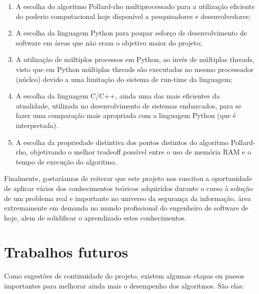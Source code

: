 \begin{enumerate}
\item A escolha do algoritmo Pollard-rho multiprocessado para a utilização eficiente do poderio computacional hoje disponível a pesquisadores e desenvolvedores;

\item A escolha da linguagem Python para poupar esforço de desenvolvimento de
software em áreas que não eram o objetivo maior do projeto;

\item A utilização de múltiplos processos em Python, ao invés de múltiplas threads, visto que em Python múltiplas threads são executadas no mesmo processador (núcleo) devido a uma limitação do sistema de run-time da linguagem;

\item A escolha da linguagem C/C++, ainda uma das mais eficientes da atualidade, utilizada no desenvolvimento de sistemas embarcados, para se fazer uma comparação mais apropriada com a linguagem Python (que é interpretada).

\item A escolha da propriedade distintiva dos pontos distintos do algoritmo Pollard-rho, objetivando o melhor tradeoff possível entre o uso de memória RAM e o tempo de execução do algoritmo.
\end{enumerate}

Finalmente, gostaríamos de reiterar que este projeto nos suscitou a oportunidade de aplicar vários dos conhecimentos teóricos adquiridos durante o curso à solução de um problema real e importante no universo da segurança da informação, área extremamente em demanda no mundo profissional do engenheiro de software de hoje, alem de solidificar o aprendizado estes conhecimentos.

\section{Trabalhos futuros}
Como sugestões de continuidade do projeto, existem algumas etapas ou passos importantes para melhorar ainda mais o desempenho dos algoritmos. São elas:

